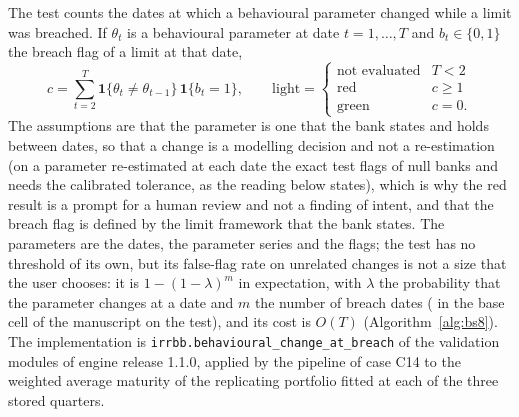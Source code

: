 The test counts the dates at which a behavioural parameter changed while a limit was breached. If $\theta_t$ is a behavioural parameter at date $t=1,\dots,T$ and $b_t\in\{0,1\}$ the breach flag of a limit at that date,
\begin{equation}
c=\sum_{t=2}^{T}\mathbf 1\{\theta_t\neq\theta_{t-1}\}\,\mathbf 1\{b_t=1\},\qquad
\text{light}=\begin{cases}\text{not evaluated}&T<2\\ \text{red}&c\ge 1\\ \text{green}&c=0.\end{cases}
\label{eq:bs8-count}
\end{equation}
The assumptions are that the parameter is one that the bank states and holds between dates, so that a change is a modelling decision and not a re-estimation (on a parameter re-estimated at each date the exact test flags \pxPpEightFitNull{} of null banks and needs the calibrated tolerance, as the reading below states), which is why the red result is a
prompt for a human review and not a finding of intent, and that the breach flag is defined by the limit framework that the bank states. The parameters are the dates, the parameter series
and the flags; the test has no threshold of its own, but its false-flag rate on unrelated changes is not a size that the user chooses: it is $1-(1-\lambda)^{m}$ in expectation, with $\lambda$ the probability that the parameter changes at a date and $m$ the number of breach dates (\pxPpEightStatedNull{} in the base cell of the manuscript on the test), and its cost is $O(T)$ (Algorithm~\ref{alg:bs8}). The implementation is \texttt{irrbb.behavioural\_change\_at\_breach} of the validation modules of
engine release 1.1.0, applied by the pipeline of case C14 to the weighted average maturity of the replicating portfolio fitted at each of the three stored quarters.

